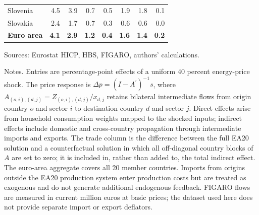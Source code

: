 \begin{table}[H]
\begin{tabular}{lrrrrrrr}
 \\
Slovenia & 4.5 & 3.9 & 0.7 & 0.5 & 1.9 & 1.8 & 0.1
 \\
Slovakia & 2.4 & 1.7 & 0.7 & 0.3 & 0.6 & 0.6 & 0.0
 \\
\midrule
\textbf{Euro area} & \textbf{4.1} & \textbf{2.9} & \textbf{1.2} & \textbf{0.4} & \textbf{1.6} & \textbf{1.4} & \textbf{0.2}
 \\
\bottomrule
\end{tabular}
\par\vspace{0.35em}\footnotesize\noindent Sources: Eurostat HICP, HBS, FIGARO, authors' calculations.
\par\vspace{0.25em}\footnotesize\noindent Notes. Entries are percentage-point effects of a uniform 40 percent energy-price shock. The price response is $\Delta p = (I - A^{\prime})^{-1}s$, where $A_{(o,i),(d,j)}=Z_{(o,i),(d,j)}/x_{d,j}$ retains bilateral intermediate flows from origin country $o$ and sector $i$ to destination country $d$ and sector $j$. Direct effects arise from household consumption weights mapped to the shocked inputs; indirect effects include domestic and cross-country propagation through intermediate imports and exports. The trade column is the difference between the full EA20 solution and a counterfactual solution in which all off-diagonal country blocks of $A$ are set to zero; it is included in, rather than added to, the total indirect effect. The euro-area aggregate covers all 20 member countries. Imports from origins outside the EA20 production system enter production costs but are treated as exogenous and do not generate additional endogenous feedback. FIGARO flows are measured in current million euros at basic prices; the dataset used here does not provide separate import or export deflators.
\end{table}
\vspace{0.6em}
